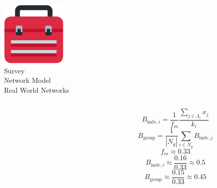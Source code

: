 \documentclass{beamer}
\begin{document}
\begin{frame}
    \begin{center}
        \includegraphics[width=.07\textwidth]{static/toolbox.png} \\ \vspace{.5cm}
        \large{Survey} \\ \vspace{.5cm}
        \large{Network Model} \\ \vspace{.5cm}
        \large{Real World Networks} \\ \vspace{.5cm}
    \end{center}
\end{frame}

\begin{frame}
    \begin{columns}
        \begin{column}{.5\textwidth}
            \begin{center}
                
            \end{center}
        \end{column} \pause
        \begin{column}{.5\textwidth}
            \begin{center}
                $$B_{\text{indv}, i} = \frac{1}{f_m} \frac{\sum_{j \in \Lambda_i} x_j}{k_i}$$
                $$B_{\text{group}} = \frac{1}{|N_g|} \sum_{i \in N_g} B_{\text{indv}, j}$$
                \pause
                $$f_m \approx 0.33$$
                $$ B_{\text{indv}, i} \approx  \frac{0.16}{0.33} \approx 0.5 $$
                \pause
                $$B_{\text{group}} \approx  \frac{0.15}{0.33} \approx 0.45 $$
            \end{center}
        \end{column}
    \end{columns}
\end{frame}
\end{document}
